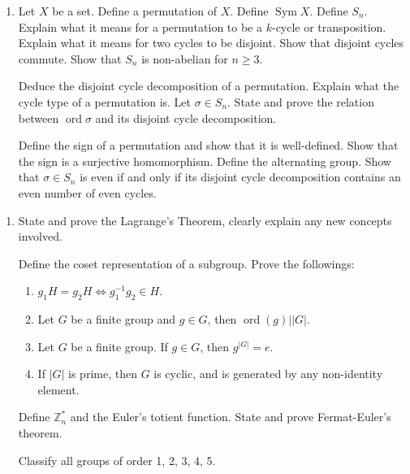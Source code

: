\documentclass{article}
\newlength{\qspace}
\newcounter{qnumber}
\newenvironment{question}%
 {\vspace{\qspace}
  \begin{enumerate}[\bfseries 1\quad][10]%
    \setcounter{enumi}{\value{qnumber}}%
    \item%
 }
{
  \end{enumerate}
  \filbreak
  \stepcounter{qnumber}
 }
\DeclareMathOperator{\ord}{ord}
\def\ge{\geqslant}
\begin{document}
\begin{question}
  Let $X$ be a set. Define a permutation of $X$. Define $ \operatorname{Sym}X $. Define $ S_n $. Explain what it means for a permutation to be a $k$-cycle or transposition. Explain what it means for two cycles to be disjoint. Show that disjoint cycles commute. Show that $ S_n $ is non-abelian for $ n\ge 3 $.

  Deduce the disjoint cycle decomposition of a permutation. Explain what the cycle type of a permutation is. Let $ \sigma\in S_n $. State and prove the relation between $ \operatorname{ord}\sigma $ and its disjoint cycle decomposition.

  Define the sign of a permutation and show that it is well-defined. Show that the sign is a surjective homomorphism. Define the alternating group. Show that $ \sigma\in S_n $ is even if and only if its disjoint cycle decomposition contains an even number of even cycles.
\end{question}

\begin{question}
  State and prove the Lagrange's Theorem, clearly explain any new concepts involved.

  Define the coset representation of a subgroup. Prove the followings:
  \begin{enumerate}
    \item $ g_1H=g_2H \Longleftrightarrow g_1^{-1}g_2\in H $.
    \item Let $G$ be a finite group and $g\in G$, then $ \ord(g)||G| $.
    \item Let $G$ be a finite group. If $g\in G$, then $ g^{|G|}=e $.
    \item If $ |G| $ is prime, then $G$ is cyclic, and is generated by any non-identity element.
  \end{enumerate}
  Define $\mathbb{Z}_n^*$ and the Euler's totient function. State and prove Fermat-Euler's theorem.

  Classify all groups of order 1, 2, 3, 4, 5.
\end{question}
\end{document}
